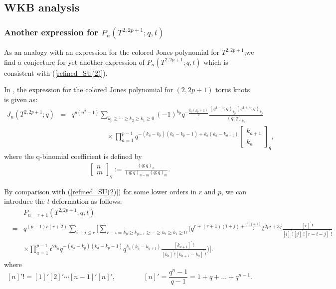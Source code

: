 \documentclass[hyper,letterpaper]{JHEP3}
\begin{document}
\subsection{WKB analysis}
\label{sec:WKB_app}
\subsubsection{Another expression for $P_n(T^{2,2p+1};q,t)$}
\label{sec:Another}
As an analogy with an expression for the colored Jones polynomial for
$T^{2,2p+1}$,we find a conjecture for yet another expression of $P_{n}(T^{2,2p+1};q,t)$ which is consistent with (\ref{refined_SU(2)}).

In \cite{Habiro,Le,Masbaum,Hikami_AJ},
the expression for the colored Jones polynomial for $(2,2p+1)$ torus knots
is given as:
\begin{eqnarray}
J_n(T^{2,2p+1};q)
&=&q^{p(n^2-1)}\sum_{k_p\ge \cdots \ge k_2\ge k_1\ge 0}
(-1)^{k_p}q^{-\frac{k_p(k_p+1)}{2}}
\frac{(q^{1-n};q)_{k_p}(q^{1+n};q)_{k_p}}{(q;q)_{k_p}}
\nonumber \\
&&\quad\quad\quad\quad\quad\times
\prod_{a=1}^{p-1}q^{-(k_a-k_p)(k_a-k_p-1)+k_a(k_a-k_{a+1})}
\left[\begin{array}{c}
k_{a+1} \\
k_a
\end{array}
\right]_q,
\label{Jones_2p+1}
\end{eqnarray}
where the q-binomial coefficient is defined by
\begin{eqnarray}
\left[\begin{array}{c}
n \\
m
\end{array}
\right]_q:=\frac{(q;q)_{n}}{(q;q)_{n-m}(q;q)_{m}}.
\end{eqnarray}

By comparison with (\ref{refined_SU(2)})
for some lower orders in $r$ and $p$,
we can introduce the $t$ deformation as follows:
\begin{eqnarray}
&&P_{n=r+1}(T^{2,2p+1};q,t)
\nonumber \\
&=&q^{(p-1)r(r+2)}\sum_{i+j\le r}
\Biggl[
\sum_{r-i=k_p\ge k_{p-1}\ge\cdots\ge k_2\ge
 k_1\ge 0}
\Biggl(
q^{r+(r+1)(i+j)+\frac{j(j+1)}{2}}t^{2pi+3j}
\frac{[r]^{\prime}!}{[i]^{\prime}![j]^{\prime}![r-i-j]^{\prime}!}
\nonumber \\
&&
\times\prod_{a=1}^{p-1}
t^{2k_a}q^{-(k_a-k_p)(k_a-k_p-1)}q^{k_a(k_a-k_{a+1})}
\frac{[k_{a+1}]^{\prime}!}{[k_a]^{\prime}![k_{a+1}-k_{a}]^{\prime}!}
\Biggr)
\Biggr].     \label{Pn-torus-another}
\end{eqnarray}
where
$$
[n]'! = [1]' [2]' \cdots [n-1]' [n]',\qquad\qquad [n]' = \frac{q^n - 1}{q-1} = 1 + q + \ldots + q^{n-1}.
$$
\end{document}
